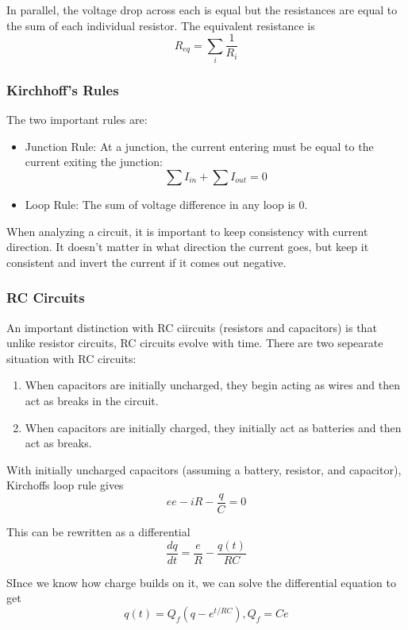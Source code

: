 \documentclass{article}
\begin{document}
In parallel, the voltage drop across each is equal but the resistances are equal to the sum of each individual resistor. The equivalent resistance is $$R_{eq}=\sum_i{\frac{1}{R_i}}$$

\subsubsection{Kirchhoff's Rules}

The two important rules are:

\begin{itemize}
	\item Junction Rule: At a junction, the current entering must be equal to the current exiting the junction: $$\sum{I_{in}}+\sum{I_{out}}=0$$

	\item Loop Rule: The sum of voltage difference in any loop is 0.
\end{itemize}

When analyzing a circuit, it is important to keep consistency with current direction. It doesn't matter in what direction the current goes, but keep it consistent and 
invert the current if it comes out negative.

\subsubsection{RC Circuits}

An important distinction with RC ciircuits (resistors and capacitors) is that unlike resistor circuits, RC circuits evolve with time.
There are two sepearate situation with RC circuits:
\begin{enumerate}
	\item When capacitors are initially uncharged, they begin acting as wires and then act as breaks in the circuit.
	\item When capacitors are initially charged, they initially act as batteries and then act as breaks.
\end{enumerate}

With initially uncharged capacitors (assuming a battery, resistor, and capacitor), Kirchoffs loop rule gives $$ee-iR-\frac{q}{C}=0$$

This can be rewritten as a differential $$\frac{dq}{dt}=\frac{e}{R}-\frac{q(t)}{RC}$$

SInce we know how charge builds on it, we can solve the differential equation to get 
\begin{equation} q(t)=Q_f(q-e^{t/RC}), Q_f=Ce \end{equation}
\end{document}
